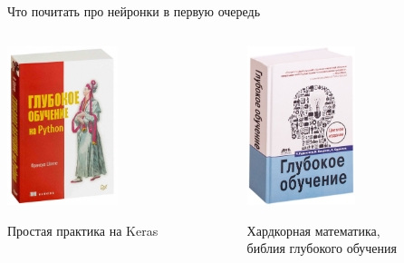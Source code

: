 \documentclass[notes,12pt, aspectratio=169]{beamer}
\begin{document}
\begin{frame}{Что почитать про нейронки в первую очередь}
\begin{columns}
	\begin{column}{0.5\textwidth}
		\begin{center}
			\includegraphics[width=0.5\textwidth]{book3.jpg}

	\footnotesize Простая практика на Keras
		\end{center}
	\end{column}
	\begin{column}{0.5\textwidth}
		\begin{center}
			\includegraphics[width=0.5\textwidth]{book4.jpg}

	\footnotesize Хардкорная математика, \\ библия глубокого обучения
		\end{center}
	\end{column}
\end{columns}
\end{frame}
\end{document}
